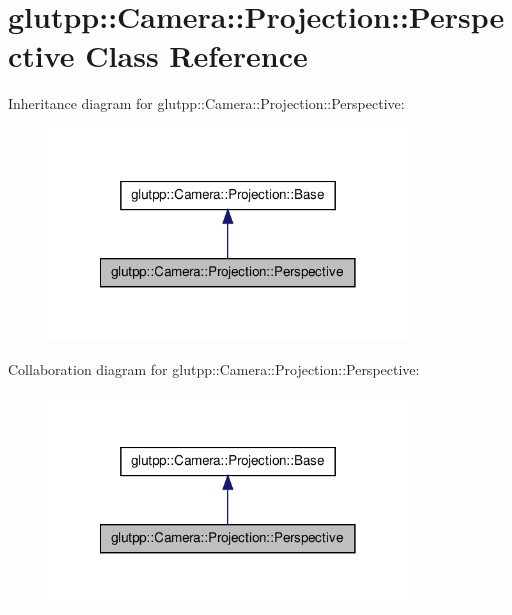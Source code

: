 \hypertarget{classglutpp_1_1Camera_1_1Projection_1_1Perspective}{\section{glutpp\-:\-:\-Camera\-:\-:\-Projection\-:\-:\-Perspective \-Class \-Reference}
\label{classglutpp_1_1Camera_1_1Projection_1_1Perspective}
}


\-Inheritance diagram for glutpp\-:\-:\-Camera\-:\-:\-Projection\-:\-:\-Perspective\-:
\nopagebreak
\begin{figure}[H]
\begin{center}
\leavevmode
\includegraphics[width=270pt]{classglutpp_1_1Camera_1_1Projection_1_1Perspective__inherit__graph}
\end{center}
\end{figure}


\-Collaboration diagram for glutpp\-:\-:\-Camera\-:\-:\-Projection\-:\-:\-Perspective\-:
\nopagebreak
\begin{figure}[H]
\begin{center}
\leavevmode
\includegraphics[width=270pt]{classglutpp_1_1Camera_1_1Projection_1_1Perspective__coll__graph}
\end{center}
\end{figure}
